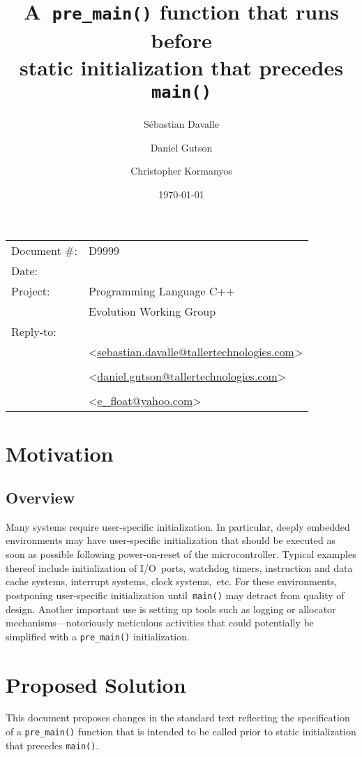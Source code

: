 \documentclass[11pt]{article}
\date{}
\title{\textbf{A~\lstinline{pre_main()} function that runs before\\
                static initialization that precedes \lstinline{main()}}}
\author{}
\makeatletter
\newcommand{\emailSD}{\href{mailto:sebastian.davalle@tallertechnologies.com}{sebastian.davalle@tallertechnologies.com}}
\newcommand{\emailDG}{\href{mailto:daniel.gutson@tallertechnologies.com}{daniel.gutson@tallertechnologies.com}}
\newcommand{\emailCK}{\href{mailto:e\_float@yahoo.com}{e\_float@yahoo.com}}
\makeatother
\begin{document}
\maketitle\vspace{-2cm}

\begin{flushright}
  \begin{tabular}{ll}
  Document \#:&D9999\\
  Date:       &\date{\today}\\
  Project:    &Programming Language C++\\
              &Evolution Working Group\\
  Reply-to:   &\author{S\'{e}bastian Davalle}\\
              &\textless\emailSD\textgreater\\
              &\author{Daniel Gutson}\\
              &\textless\emailDG\textgreater\\
              &\author{Christopher Kormanyos}\\
              &\textless\emailCK\textgreater\\
  \end{tabular}
\end{flushright}

\section{Motivation}
\subsection*{Overview}
Many systems require user-specific initialization. In particular,
deeply embedded environments may have user-specific initialization
that should be executed as soon as possible following power-on-reset
of the microcontroller.
Typical examples thereof include initialization of
I/O~ports, watchdog timers, instruction and data cache systems,
interrupt systems, clock systems,~etc. For these environments,
postponing user-specific initialization until~\lstinline{main()}
may detract from quality of design.
Another important use is setting up tools such as logging or allocator
mechanisms---notoriously meticulous activities that could
potentially be simplified with a \lstinline{pre_main()} initialization.

\section{Proposed Solution}
This document proposes changes in the standard text reflecting
the specification of a \lstinline{pre_main()} function
that is intended to be called prior to static initialization that
precedes \lstinline{main()}.
\end{document}
